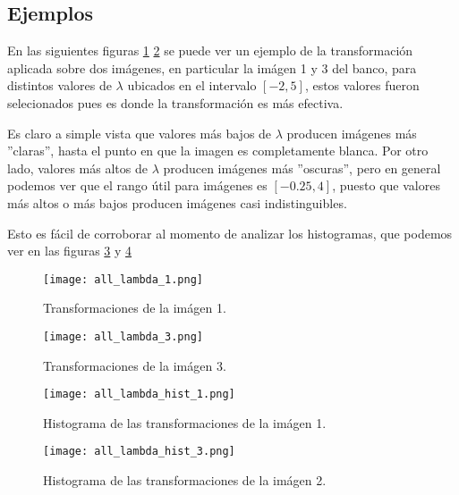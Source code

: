     \subsection{Ejemplos}
    
    En las siguientes figuras \ref{fig:all_lambda_1} \ref{fig:all_lambda_2} se puede ver un ejemplo de la transformaci\'on aplicada sobre dos im\'agenes, en particular la im\'agen 1 y 3 del banco, para distintos valores de $\lambda$ ubicados en el intervalo $[-2,5]$, estos valores fueron selecionados pues es donde la transformaci\'on es m\'as efectiva.

    Es claro a simple vista que valores m\'as bajos de $\lambda$ producen im\'agenes m\'as ''claras'', hasta el punto en que la imagen es completamente blanca. Por otro lado, valores m\'as altos de $\lambda$ producen im\'agenes m\'as ''oscuras'', pero en general podemos ver que el rango \'util para im\'agenes es $[-0.25,4]$, puesto que valores m\'as altos o m\'as bajos producen im\'agenes casi indistinguibles. 

    Esto es f\'acil de corroborar al momento de analizar los histogramas, que podemos ver en las figuras \ref{fig:img_bci_hist_1} y \ref{fig:img_bci_hist_2} 

    \begin{figure}
        \centering
        \texttt{[image: all\_lambda\_1.png]}
        \caption{Transformaciones de la im\'agen 1.}
        \label{fig:all_lambda_1}
    \end{figure}

    \begin{figure}
        \centering
        \texttt{[image: all\_lambda\_3.png]}
        \caption{Transformaciones de la im\'agen 3.}
        \label{fig:all_lambda_2}
    \end{figure}

    \begin{figure}
        \centering
        \texttt{[image: all\_lambda\_hist\_1.png]}
        \caption{Histograma de las transformaciones de la im\'agen 1.}
        \label{fig:img_bci_hist_1}
    \end{figure}

    \begin{figure}
        \centering
        \texttt{[image: all\_lambda\_hist\_3.png]}
        \caption{Histograma de las transformaciones de la im\'agen 2.}
        \label{fig:img_bci_hist_2}
    \end{figure}

